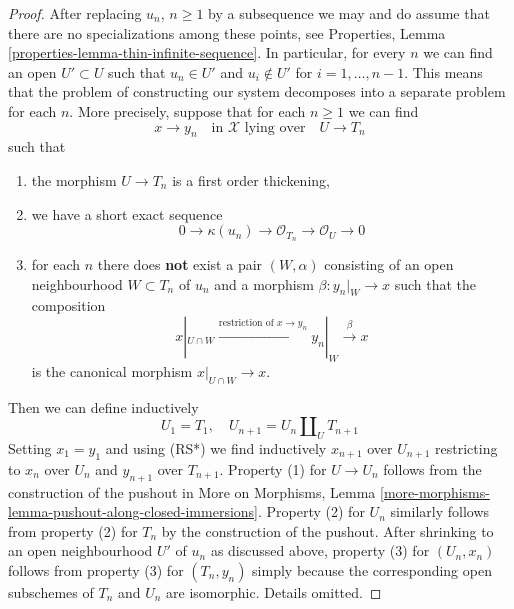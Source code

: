 \begin{proof}
After replacing $u_n$, $n \geq 1$ by a subsequence we may and do
assume that there are no specializations among these points, see
Properties, Lemma \ref{properties-lemma-thin-infinite-sequence}.
In particular, for every $n$ we can find an open $U' \subset U$
such that $u_n \in U'$ and $u_i \not \in U'$ for $i = 1, \ldots, n - 1$.
This means that the problem of constructing our system
decomposes into a separate problem for each $n$.
More precisely, suppose that for each $n \geq 1$ we can find
$$
x \to y_n
\quad\text{in }\mathcal{X}\text{ lying over}\quad
U \to T_n
$$
such that
\begin{enumerate}
\item the morphism $U \to T_n$ is a first order thickening,
\item we have a short exact sequence
$$
0 \to \kappa(u_n) \to \mathcal{O}_{T_n} \to \mathcal{O}_U \to 0
$$
\item for each $n$ there does {\bf not} exist a pair $(W, \alpha)$
consisting of an open neighbourhood $W \subset T_n$ of $u_n$
and a morphism $\beta : y_n|_W \to x$ such that the composition
$$
x|_{U \cap W} \xrightarrow{\text{restriction of }x \to y_n}
y_n|_W \xrightarrow{\beta} x
$$
is the canonical morphism $x|_{U \cap W} \to x$.
\end{enumerate}
Then we can define inductively
$$
U_1 = T_1, \quad
U_{n + 1} = U_n \amalg_U T_{n + 1}
$$
Setting $x_1 = y_1$ and using (RS*) we find inductively
$x_{n + 1}$ over $U_{n + 1}$ restricting to
$x_n$ over $U_n$ and $y_{n + 1}$ over $T_{n + 1}$.
Property (1) for $U \to U_n$ follows from the construction
of the pushout in More on Morphisms, Lemma
\ref{more-morphisms-lemma-pushout-along-closed-immersions}.
Property (2) for $U_n$ similarly follows from
property (2) for $T_n$ by the construction of the pushout.
After shrinking to an open neighbourhood $U'$ of $u_n$
as discussed above, property (3) for $(U_n, x_n)$ follows from property (3)
for $(T_n, y_n)$ simply because the corresponding open subschemes
of $T_n$ and $U_n$ are isomorphic. Details omitted.


\end{proof}
